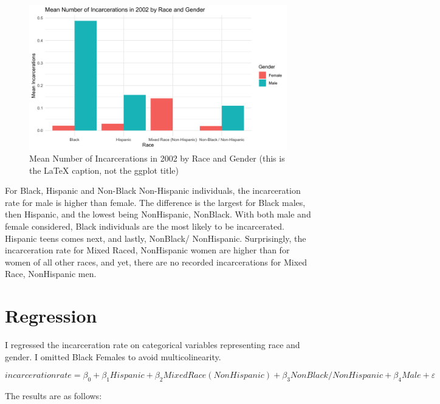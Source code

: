 \documentclass{article}
\begin{document}
\begin{figure}[H]
    \begin{center}
        \includegraphics[width=.85\textwidth]{incarcerations_by_racegender.png}
    \end{center}
    \caption{Mean Number of Incarcerations in 2002 by Race and Gender (this is the LaTeX caption, not the ggplot title)}
    \label{fig:graph}
\end{figure}

For Black, Hispanic and Non-Black Non-Hispanic individuals, the incarceration rate for male is higher than female. The difference is the largest for Black males, then Hispanic, and the lowest being NonHispanic, NonBlack. 
With both male and female considered, Black individuals are the most likely to be incarcerated. Hispanic teens comes next, and lastly, NonBlack/ NonHispanic. Surprisingly, the incarceration rate for Mixed Raced, NonHispanic women
are higher than for women of all other races, and yet, there are no recorded incarcerations for Mixed Race, NonHispanic men. 

\section{Regression}

I regressed the incarceration rate on categorical variables representing race and gender. I omitted Black Females to avoid multicolinearity. 

$$
    incarceration rate = \beta_{0} + \beta_{1}Hispanic + \beta_{2}Mixed Race (NonHispanic) + \beta_{3} NonBlack/ NonHispanic + \beta_{4} Male + \varepsilon
$$

The results are as follows: 


\end{document}
